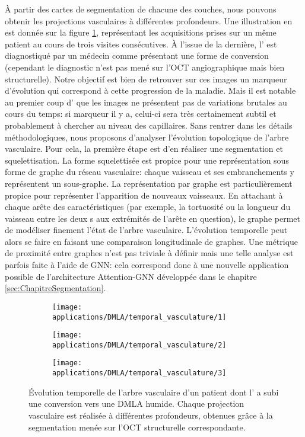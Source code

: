 À partir des cartes de segmentation de chacune des couches, nous pouvons obtenir les projections vasculaires à différentes profondeurs. Une illustration en est donnée sur la figure \ref{fig:AngioOCTVascularTemporal}, représentant les acquisitions prises sur un même patient au cours de trois visites consécutives. À l'issue de la dernière, l'\oeil{} est diagnostiqué par un médecin comme présentant une forme de conversion (cependant le diagnostic n'est pas mené sur l'OCT angiographique mais bien structurelle). Notre objectif est bien de retrouver sur ces images un marqueur d'évolution qui correspond à cette progression de la maladie. Mais il est notable au premier coup d'\oeil{} que les images ne présentent pas de variations brutales au cours du temps: si marqueur il y a, celui-ci sera très certainement subtil et probablement à chercher au niveau des capillaires. Sans rentrer dans les détails méthodologiques, nous proposons d'analyser l'évolution topologique de l'arbre vasculaire. Pour cela, la première étape est d'en réaliser une segmentation et squelettisation. La forme squelettisée est propice pour une représentation sous forme de graphe du réseau vasculaire: chaque vaisseau et ses embranchements y représentent un sous-graphe. La représentation par graphe est particulièrement propice pour représenter l'apparition de nouveaux vaisseaux. En attachant à chaque arête des caractéristiques (par exemple, la tortuosité ou la longueur du vaisseau entre les deux \noeud{}s aux extrémités de l'arête en question), le graphe permet de modéliser finement l'état de l'arbre vasculaire.  L'évolution temporelle peut alors se faire en faisant une comparaison longitudinale de graphes. Une métrique de proximité entre graphes n'est pas triviale à définir mais une telle analyse est parfois faite à l'aide de GNN: cela correspond donc à une nouvelle application possible de l'architecture Attention-GNN développée dans le chapitre \ref{sec:ChapitreSegmentation}. 
\begin{figure}[!ht]
	\centering
	\begin{subfigure}{.9\textwidth}
		\texttt{[image: applications/DMLA/temporal\_vasculature/1]}
	\end{subfigure}
	\begin{subfigure}{.9\textwidth}
		\texttt{[image: applications/DMLA/temporal\_vasculature/2]}
	\end{subfigure}
	\begin{subfigure}{.9\textwidth}
		\texttt{[image: applications/DMLA/temporal\_vasculature/3]}
	\end{subfigure}
\caption{Évolution temporelle de l'arbre vasculaire d'un patient dont l'\oeil{} a subi une conversion vers une DMLA humide. Chaque projection vasculaire est réalisée à différentes profondeurs, obtenues grâce à la segmentation menée sur l'OCT structurelle correspondante.}
\label{fig:AngioOCTVascularTemporal}
\end{figure}

